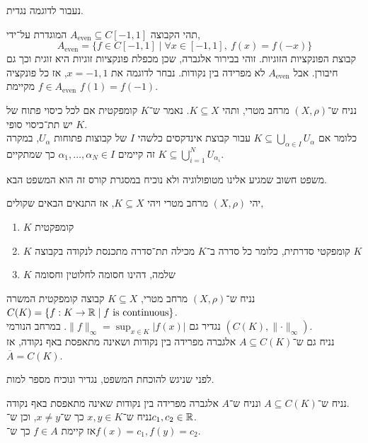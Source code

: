 נעבור לדוגמה נגדית.
\begin{example}
	תהי הקבוצה $A_{\text{even}} \subseteq C[-1, 1]$ המוגדרת על־ידי,
	\[
		A_{\text{even}}
		= \{ f \in C[-1, 1] \mid \forall x \in [-1, 1],\ f(x) = f(-x) \}
	\]
	קבוצת הפונקציות הזוגיות.
	זוהי בבירור אלגברה, שכן מכפלת פונקציות זוגיות היא זוגית וכך גם חיבורן.
	אבל $A_{\text{even}}$ לא מפרידה בין נקודות.
	נבחר לדוגמה את $x = -1, 1$, אז כל פונקציה $f \in A_{\text{even}}$ מקיימת $f(1) = f(-1)$.
\end{example}
\begin{definition}
	נניח ש־$(X, \rho)$ מרחב מטרי, ותהי $K \subseteq X$.
	נאמר ש־$K$ קומפקטית אם לכל כיסוי פתוח של $K$ יש תת־כיסוי סופי. \\
	כלומר אם $K \subseteq \bigcup_{\alpha \in I} U_{\alpha}$ עבור קבוצת אינדקסים כלשהי $I$ של קבוצות פתוחות $U_{\alpha}$,
	במקרה זה קיימים $\alpha_1, \ldots, \alpha_N \in I$ כך שמתקיים $K \subseteq \bigcup_{i = 1}^N U_{\alpha_i}$.
\end{definition}
משפט חשוב שמגיע אלינו מטופולוגיה ולא נוכיח במסגרת קורס זה הוא המשפט הבא.
\begin{theorem}
	יהי $(X, \rho)$ מרחב מטרי ויהי $K \subseteq X$, אז התנאים הבאים שקולים,
	\begin{enumerate}
		\item $K$ קומפקטית
		\item $K$ קומפקטי סדרתית,
			כלומר כל סדרה ב־$K$ מכילה תת־סדרה מתכנסת לנקודה בקבוצה $K$
		\item $K$ שלמה, דהינו חסומה לחלוטין וחסומה
	\end{enumerate}
\end{theorem}
\begin{theorem}\label{stone_weistrass_theorem}
	נניח ש־$(X, \rho)$ מרחב מטרי,
	$K \subseteq X$ קבוצה קומפקטית המשרה $C(K) = \{ f : K \to \mathbb{R} \mid f \text{ is continuous} \}$. \\
	נגדיר גם $\lVert f \rVert_\infty = \sup_{x \in K} |f(x)|$.
	במרחב הנורמי $(C(K), \lVert \cdot \rVert_\infty)$. \\
	נניח גם ש־$A \subseteq C(K)$ אלגברה מפרידה בין נקודות ושאינה מתאפסת באף נקודה,
	אז $\overline{A} = C(K)$.
\end{theorem}
לפני שניגש להוכחת המשפט, נגדיר ונוכיח מספר למות.
\begin{lemma}
	נניח ש־$A \subseteq C(K)$ ונניח ש־$A$ אלגברה מפרידה בין נקודות שאינה מתאפסת באף נקודה. \\
	נניח ש־$x, y \in K$ כך ש־$x \ne y$, וכן ש־$c_1, c_2 \in \mathbb{R}$. \\
	אז קיימת $f \in A$ כך ש־$f(x) = c_1, f(y) = c_2$.
\end{lemma}
